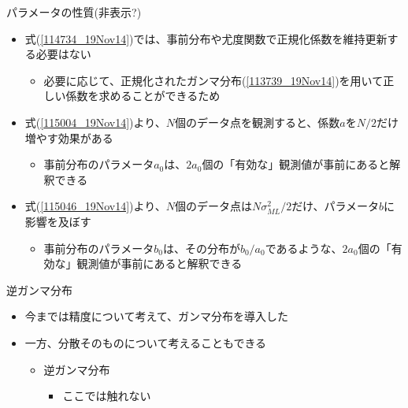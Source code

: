 \begin{frame}{パラメータの性質(非表示?)}
 \begin{itemize}
  \item 式(\ref{114734_19Nov14})では、事前分布や尤度関数で正規化係数を維持更新する必要はない
        \begin{itemize}
         \item 必要に応じて、正規化されたガンマ分布(\ref{113739_19Nov14})を用いて正しい係数を求めることができるため
        \end{itemize}
  \item 式(\ref{115004_19Nov14})より、$N$個のデータ点を観測すると、係数$a$を$N/2$だけ増やす効果がある
        \begin{itemize}
         \item 事前分布のパラメータ$a_0$は、$2a_0$個の「有効な」観測値が事前にあると解釈できる
        \end{itemize}
  \item 式(\ref{115046_19Nov14})より、$N$個のデータ点は$N\sigma_{ML}^2/2$だけ、パラメータ$b$に影響を及ぼす
        \begin{itemize}
         \item 事前分布のパラメータ$b_0$は、その分布が$b_0/a_0$であるような、$2a_0$個の「有効な」観測値が事前にあると解釈できる
        \end{itemize}
 \end{itemize}
\end{frame}

\begin{frame}{逆ガンマ分布}
 \begin{itemize}
  \item 今までは精度について考えて、ガンマ分布を導入した
  \item 一方、分散そのものについて考えることもできる
        \begin{itemize}
         \item \alert{逆ガンマ分布}
               \begin{itemize}
                \item ここでは触れない
               \end{itemize}
        \end{itemize}
 \end{itemize}
\end{frame}

